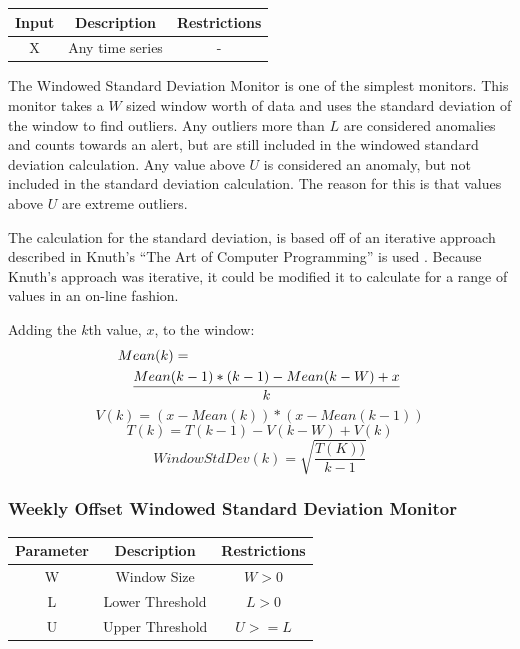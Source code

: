 \documentclass[12pt]{ucthesis}
\begin{document}
\begin{table}[H]
   \begin{center}
      \begin{tabular}{|c|c|c|}
         \hline
            Input & Description & Restrictions \\
         \hline
            X & Any time series & - \\
         \hline
      \end{tabular}
   \end{center}
\end{table}

The Windowed Standard Deviation Monitor is one of the simplest monitors. This monitor takes a $W$ sized window worth of data
and uses the standard deviation of the window to find outliers. Any outliers more than $L$ are considered anomalies and counts towards
an alert, but are still included in the windowed standard deviation calculation. Any value above $U$ is considered an anomaly, but not included
in the standard deviation calculation. The reason for this is that values above $U$ are extreme outliers.

The calculation for the standard deviation, is based off of an iterative approach described in Knuth's ``The Art of Computer Programming'' is used \cite{Knuth}.
Because Knuth's approach was iterative, it could be modified it to calculate for a range of values in an on-line fashion.

Adding the $k$th value, $x$, to the window:
\begin{eqnarray*}
   \lefteqn{Mean(k) = }\\
   && \frac{Mean(k - 1) * (k - 1) - Mean(k - W) + x}{k}
\end{eqnarray*}
$$
   V(k) = (x - Mean(k)) * (x - Mean(k - 1))
$$
$$
   T(k) = T(k - 1) - V(k - W) + V(k)
$$
$$
   WindowStdDev(k) = \sqrt{\frac{T(K))}{k - 1}}
$$

\subsubsection{Weekly Offset Windowed Standard Deviation Monitor}
\label{outage-detection-monitors-WeeklyWindowStdDev}
\begin{table}[H]
   \begin{center}
      \begin{tabular}{|c|c|c|}
         \hline
            Parameter & Description & Restrictions \\
         \hline
            W & Window Size & $ W > 0 $\\
         \hline
            L & Lower Threshold & $L > 0 $\\
         \hline 
            U & Upper Threshold & $U >= L $\\
         \hline 
      \end{tabular}
   \end{center}
\end{table}
\end{document}
